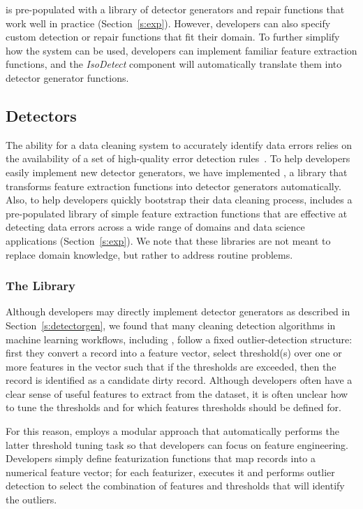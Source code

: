 \sys is pre-populated with a library of detector generators and repair functions that work well in practice (Section~\ref{s:exp}).  However,  developers can also specify custom detection or repair functions that fit their domain.  To further simplify how the system can be used, developers can implement familiar feature extraction functions, and the {\it IsoDetect} component will automatically translate them into detector generator functions.

\subsection{Detectors}
The ability for a data cleaning system to accurately identify data errors relies on the availability of a set of high-quality error detection rules~\cite{DBLP:conf/sigmod/ChuIKW16}.  To help developers easily implement new detector generators, we have implemented \detectlib, a library that transforms feature extraction functions into detector generators automatically.  Also, to help developers quickly bootstrap their data cleaning process, \sys includes a pre-populated library of simple feature extraction functions that are effective at detecting data errors across a wide range of domains and data science applications (Section~\ref{s:exp}).  We note that these libraries are not meant to replace domain knowledge, but rather to address routine problems.

\subsubsection{The \detectlib Library}
Although developers may directly implement detector generators as described in Section~\ref{s:detectorgen}, we found that many cleaning detection algorithms in machine learning workflows, including \company, follow a fixed outlier-detection structure: first they convert a record into a feature vector,  select threshold(s) over one or more features in the vector such that if the thresholds are exceeded, then the record is identified as a candidate dirty record.  Although developers often have a clear sense of useful features to extract from the dataset, it is often unclear how to tune the thresholds and for which features thresholds should be defined for.  

For this reason, \detectlib employs a modular approach that automatically performs the latter threshold tuning task so that developers can focus on feature engineering.   Developers simply define featurization functions that map records into a numerical feature vector; for each featurizer, \detectlib executes it and performs outlier detection to select the combination of features and thresholds that will identify the outliers.  

